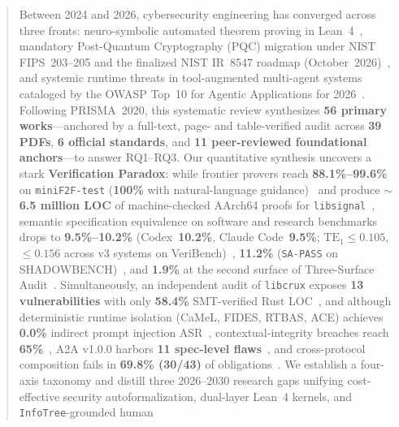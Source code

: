 \documentclass[10pt,twocolumn]{article}
\begin{document}
\begin{abstract}
\small
Between 2024 and 2026, cybersecurity engineering has converged across three fronts: neuro-symbolic automated theorem proving in Lean~4~\cite{demoura2021lean4,yang2023leandojo,aniva2025pantograph,hubert2025alphaproof,tsoukalas2026nexus,wang2025kimina,ren2025deepseekproverv2,lin2025goedelprover,lin2026goedelproverv2,chung2026goedelarchitect,chen2025seedprover,chen2025seedprover15,firsching2026formalconjectures,xin2026axle,carneiro2025lean4lean,yang2026proofgate}, mandatory Post-Quantum Cryptography (PQC) migration under NIST FIPS~203--205 and the finalized NIST IR~8547 roadmap (October~2026)~\cite{nist2024fips203,nist2024fips204,nist2024fips205,alagic2025nistir8545,moody2026nistir8547,ho2022aeneas,ho2026symcrypt,bhargavan2025hax,kobeissi2026theatre,almeida2024kyber,barbosa2024sphincs,chaudhuri2026alphaproofcode,klaus2026rustlean,park2026pqchw,benshahar2026qkd}, and systemic runtime threats in tool-augmented multi-agent systems cataloged by the OWASP Top~10 for Agentic Applications for 2026~\cite{owasp2025agentic,kim2026sok,debenedetti2024agentdojo,debenedetti2026camel,li2025drift,costa2025fides,zhong2025rtbas,shi2025progent,li2026ace,abdelnabi2026ci,wang2026lean4agent,mondl2026policyascode,lotfi2026a2abreak,agentthread2026}. Following PRISMA~2020, this systematic review synthesizes \textbf{56 primary works}---anchored by a full-text, page- and table-verified audit across \textbf{39 PDFs}, \textbf{6 official standards}, and \textbf{11 peer-reviewed foundational anchors}---to answer RQ1--RQ3. Our quantitative synthesis uncovers a stark \textbf{Verification Paradox}: while frontier provers reach \textbf{88.1\%--99.6\%} on \texttt{miniF2F-test} (\textbf{100\%} with natural-language guidance)~\cite{ren2025deepseekproverv2,lin2026goedelproverv2,chung2026goedelarchitect,chen2025seedprover} and produce \textbf{$\sim$6.5 million LOC} of machine-checked AArch64 proofs for \texttt{libsignal}~\cite{chaudhuri2026alphaproofcode}, semantic specification equivalence on software and research benchmarks drops to \textbf{9.5\%--10.2\%} (Codex~\textbf{10.2\%}, Claude Code~\textbf{9.5\%}; $\mathrm{TE}_1 \le 0.105$, $\le 0.156$ across v3 systems on VeriBench)~\cite{miranda2026veribench}, \textbf{11.2\%} (\texttt{SA-PASS} on SHADOWBENCH)~\cite{han2026shadowbench}, and \textbf{1.9\%} at the second surface of Three-Surface Audit~\cite{threesurface2026}. Simultaneously, an independent audit of \texttt{libcrux} exposes \textbf{13 vulnerabilities} with only \textbf{58.4\%} SMT-verified Rust LOC~\cite{kobeissi2026theatre}, and although deterministic runtime isolation (CaMeL, FIDES, RTBAS, ACE) achieves \textbf{0.0\%} indirect prompt injection ASR~\cite{debenedetti2026camel,costa2025fides,zhong2025rtbas,li2026ace}, contextual-integrity breaches reach \textbf{65\%}~\cite{abdelnabi2026ci}, A2A v1.0.0 harbors \textbf{11 spec-level flaws}~\cite{lotfi2026a2abreak}, and cross-protocol composition fails in \textbf{69.8\% (30/43)} of obligations~\cite{agentthread2026}. We establish a four-axis taxonomy and distill three 2026--2030 research gaps unifying cost-effective security autoformalization, dual-layer Lean~4 kernels, and \texttt{InfoTree}-grounded human 
\end{abstract}
\end{document}
